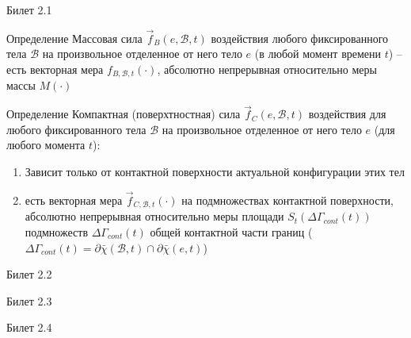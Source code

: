 \documentclass[a4paper,12pt]{article}
\newcommand{\mr}{\mathscr}
\begin{document}
\begin{mybox}{\hypertarget{bil2_1}{Билет 2.1}}
\begin{enumerate}
    \begin{mybox2}{Определение}
    Массовая сила $\vec{f}_B(e, \mathscr{B}, t)$  воздействия любого фиксированного тела $\mathscr{B}$ на произвольное отделенное от него тело $e$ (в любой момент времени $t$) -- есть векторная мера $f_{B, \mathscr{B}, t}(\cdot)$, абсолютно непрерывная относительно меры массы $M(\cdot)$
    \end{mybox2}
    \begin{mybox2}{Определение}
    Компактная (поверхтностная) сила $\vec{f}_C (e, \mr{B}, t)$ воздействия для любого фиксированного тела $\mr{B}$ на произвольное отделенное от него тело $e$ (для любого момента $t$):
    \begin{enumerate}
        \item Зависит только от контактной поверхности актуальной конфигурации этих тел
        \item есть векторная мера $\vec{f}_{C, \mr{B}, t}(\cdot)$ на подмножествах контактной поверхности, абсолютно непрерывная относительно меры площади $S_{t}(\Delta \Gamma_{cont}(t))$ подмножеств $\Delta \Gamma_{cont}(t)$ общей контактной части границ ($\Delta \Gamma_{cont}(t) = \partial \bar{\chi}(\mr{B}, t) \cap \partial \bar{\chi}(e, t) $)
    \end{enumerate}
    \end{mybox2}
\end{enumerate}
\end{mybox}
\newpage
\begin{mybox}{\hypertarget{bil2_2}{Билет 2.2}}
\end{mybox}
\newpage
\begin{mybox}{\hypertarget{bil2_3}{Билет 2.3}}
\end{mybox}
\newpage
\begin{mybox}{\hypertarget{bil2_4}{Билет 2.4}}
\end{mybox}
\end{document}
